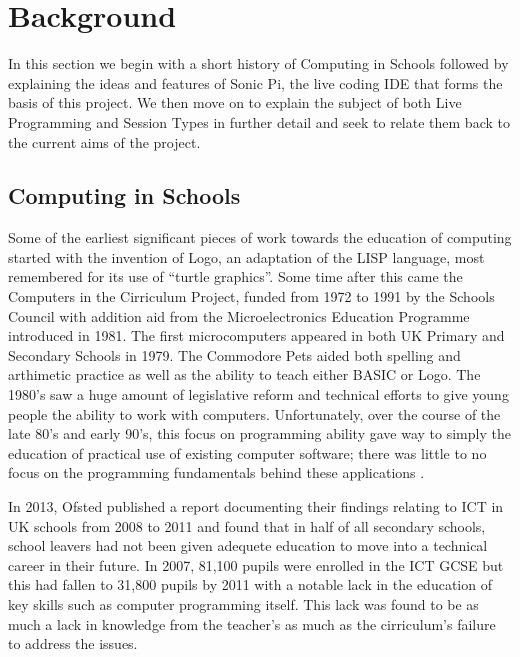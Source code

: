 \documentclass[11pt, abstracton, twoside, titlepage=true]{scrartcl}
\begin{document}
\section{Background}
\thispagestyle{empty}
In this section we begin with a short history of Computing in Schools followed 
by explaining the ideas and features of Sonic Pi, the live coding IDE that forms 
the basis of this project. We then move on to explain the subject of both Live 
Programming and Session Types in further detail and seek to relate them back to 
the current aims of the project.

\subsection{Computing in Schools}
Some of the earliest significant pieces of work towards the 
education of computing started with the invention of Logo, an adaptation of 
the LISP language, most remembered for its use of ``turtle graphics''. Some 
time after this came the Computers in the Cirriculum Project, funded from 
1972 to 1991 by the Schools Council with addition aid from the Microelectronics 
Education Programme introduced in 1981. The first microcomputers appeared in 
both UK Primary and Secondary Schools in 1979. The Commodore Pets aided both 
spelling and arthimetic practice as well as the ability to teach either BASIC or 
Logo. The 1980's saw a huge amount of legislative reform and technical efforts 
to give young people the ability to work with computers. Unfortunately, over the 
course of the late 80's and early 90's, this focus on programming ability gave 
way to simply the education of practical use of existing computer software; 
there was little to no focus on the programming fundamentals behind 
these applications \cite{naec}.

In 2013, Ofsted published a report documenting their findings relating to ICT 
in UK schools from 2008 to 2011 and found that in half of all secondary 
schools, school leavers had not been given adequete education to move into a 
technical career in their future. In 2007, 81,100 pupils were enrolled in the 
ICT GCSE but this had fallen to 31,800 pupils by 2011 \cite{DfEO13} with a 
notable lack in the education of key skills such as computer programming 
itself. This lack was found to be as much a lack in knowledge from the 
teacher's as much as the cirriculum's failure to address the issues.
\end{document}
